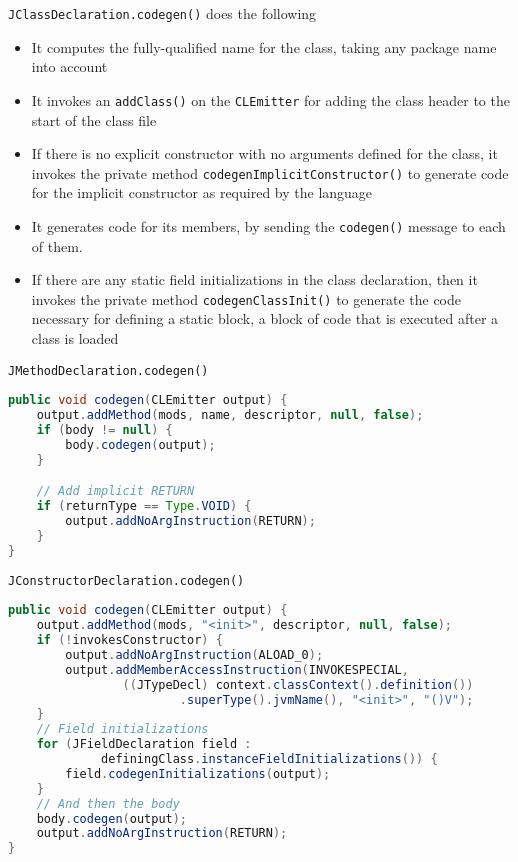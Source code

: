 \documentclass[8pt,a4paper,compress]{beamer}
\begin{document}
\begin{frame}[fragile]
\pause

\lstinline{JClassDeclaration.codegen()} does the following
\begin{itemize}
\item It computes the fully-qualified name for the class, taking any package name into account
\item It invokes an \lstinline{addClass()} on the \lstinline{CLEmitter} for adding the class header to the start of the class file
\item If there is no explicit constructor with no arguments defined for the class, it invokes the private method \lstinline{codegenImplicitConstructor()} to generate code for the implicit constructor as required by the language
\item It generates code for its members, by sending the \lstinline{codegen()} message to each of them.
\item If there are any static field initializations in the class declaration, then it invokes the private method \lstinline{codegenClassInit()} to generate the code necessary for defining a static block, a block of code that is executed after a class is loaded
\end{itemize}
\end{frame}

\begin{frame}[fragile]
\pause

\lstinline{JMethodDeclaration.codegen()}
\begin{lstlisting}[language=Java]
public void codegen(CLEmitter output) {
    output.addMethod(mods, name, descriptor, null, false);
    if (body != null) {
        body.codegen(output);
    }

    // Add implicit RETURN
    if (returnType == Type.VOID) {
        output.addNoArgInstruction(RETURN);
    }
}
\end{lstlisting}

\pause
\bigskip

\lstinline{JConstructorDeclaration.codegen()}
\begin{lstlisting}[language=Java]
public void codegen(CLEmitter output) {
    output.addMethod(mods, "<init>", descriptor, null, false);
    if (!invokesConstructor) {
        output.addNoArgInstruction(ALOAD_0);
        output.addMemberAccessInstruction(INVOKESPECIAL,
                ((JTypeDecl) context.classContext().definition())
                        .superType().jvmName(), "<init>", "()V");
    }
    // Field initializations
    for (JFieldDeclaration field : 
             definingClass.instanceFieldInitializations()) {
        field.codegenInitializations(output);
    }
    // And then the body
    body.codegen(output);
    output.addNoArgInstruction(RETURN);
}
\end{lstlisting}
\end{frame}
\end{document}
